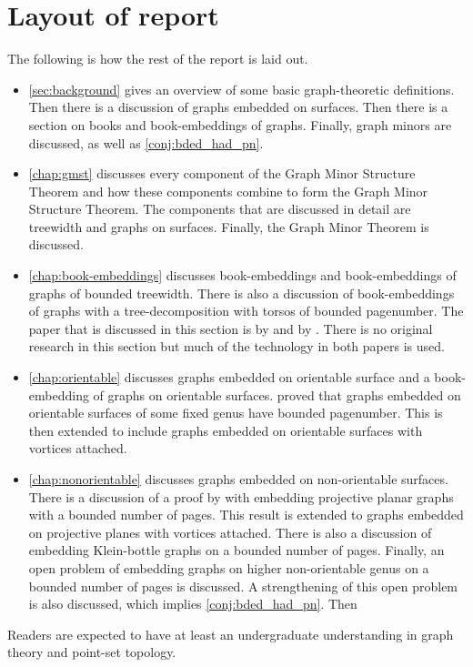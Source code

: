 \section{Layout of report}
The following is how the rest of the report is laid out. 
\begin{itemize}
	\item \cref{sec:background} gives an overview of some basic graph-theoretic definitions. Then there is a discussion of graphs embedded on surfaces. Then there is a section on books and book-embeddings of graphs. Finally, graph minors are discussed, as well as \cref{conj:bded_had_pn}. 
	\item \cref{chap:gmst} discusses every component of the Graph Minor Structure Theorem and how these components combine to form the Graph Minor Structure Theorem. The components that are discussed in detail are treewidth and graphs on surfaces. Finally, the Graph Minor Theorem is discussed.
	\item \cref{chap:book-embeddings} discusses book-embeddings and book-embeddings of graphs of bounded treewidth. There is also a discussion of book-embeddings of graphs with a tree-decomposition with torsos of bounded pagenumber. The paper that is discussed in this section is by \textcite{hickingbothamStackNumberCliqueSum2023} and by \textcite{ganleyPagenumberTrees2001}. There is no original research in this section but much of the technology in both papers is used. 
	\item \cref{chap:orientable} discusses graphs embedded on orientable surface and a book-embedding of graphs on orientable surfaces. \textcite{heathPagenumberGenusGraphs1992} proved that graphs embedded on orientable surfaces of some fixed genus have bounded pagenumber. This is then extended to include graphs embedded on orientable surfaces with vortices attached. 
	\item \cref{chap:nonorientable} discusses graphs embedded on non-orientable surfaces. There is a discussion of a proof by \textcite{nakamotoBookEmbeddingProjectiveplanar2015} with embedding projective planar graphs with a bounded number of pages. This result is extended to graphs embedded on projective planes with vortices attached. There is also a discussion of embedding Klein-bottle graphs on a bounded number of pages. Finally, an open problem of embedding graphs on higher non-orientable genus on a bounded number of pages is discussed. A strengthening of this open problem is also discussed, which implies \cref{conj:bded_had_pn}. Then 
\end{itemize}

Readers are expected to have at least an undergraduate understanding in graph theory and point-set topology. 
